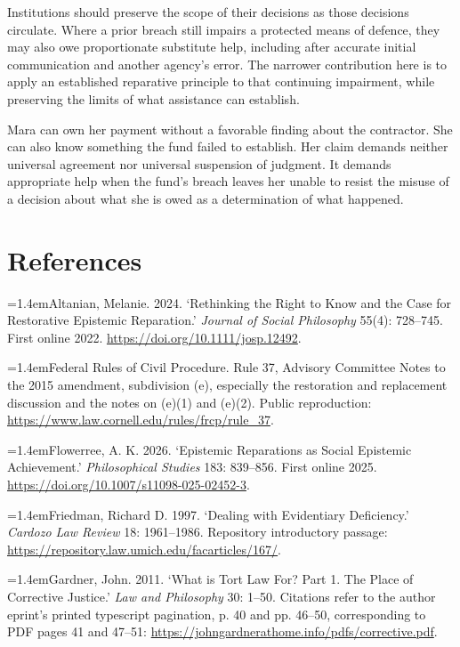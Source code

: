Institutions should preserve the scope of their decisions as those decisions circulate. Where a prior breach still impairs a protected means of defence, they may also owe proportionate substitute help, including after accurate initial communication and another agency’s error. The narrower contribution here is to apply an established reparative principle to that continuing impairment, while preserving the limits of what assistance can establish.

Mara can own her payment without a favorable finding about the contractor. She can also know something the fund failed to establish. Her claim demands neither universal agreement nor universal suspension of judgment. It demands appropriate help when the fund’s breach leaves her unable to resist the misuse of a decision about what she is owed as a determination of what happened.

\clearpage\section*{References}\begingroup\fontsize{10}{13}\selectfont\setlength{\parindent}{0pt}\setlength{\parskip}{0.55em}\raggedright

\hypertarget{ref:altanian2024}{}\hangindent=1.4em\noindent Altanian, Melanie. 2024. ‘Rethinking the Right to Know and the Case for Restorative Epistemic Reparation.’ \emph{Journal of Social Philosophy} 55(4): 728–745. First online 2022. \url{https://doi.org/10.1111/josp.12492}.

\hypertarget{ref:rule37}{}\hangindent=1.4em\noindent Federal Rules of Civil Procedure. Rule 37, Advisory Committee Notes to the 2015 amendment, subdivision (e), especially the restoration and replacement discussion and the notes on (e)(1) and (e)(2). Public reproduction: \url{https://www.law.cornell.edu/rules/frcp/rule_37}.

\hypertarget{ref:flowerree2026}{}\hangindent=1.4em\noindent Flowerree, A. K. 2026. ‘Epistemic Reparations as Social Epistemic Achievement.’ \emph{Philosophical Studies} 183: 839–856. First online 2025. \url{https://doi.org/10.1007/s11098-025-02452-3}.

\hypertarget{ref:friedman1997}{}\hangindent=1.4em\noindent Friedman, Richard D. 1997. ‘Dealing with Evidentiary Deficiency.’ \emph{Cardozo Law Review} 18: 1961–1986. Repository introductory passage: \url{https://repository.law.umich.edu/facarticles/167/}.

\hypertarget{ref:gardner2011}{}\hangindent=1.4em\noindent Gardner, John. 2011. ‘What is Tort Law For? Part 1. The Place of Corrective Justice.’ \emph{Law and Philosophy} 30: 1–50. Citations refer to the author eprint’s printed typescript pagination, p. 40 and pp. 46–50, corresponding to PDF pages 41 and 47–51: \url{https://johngardnerathome.info/pdfs/corrective.pdf}.

